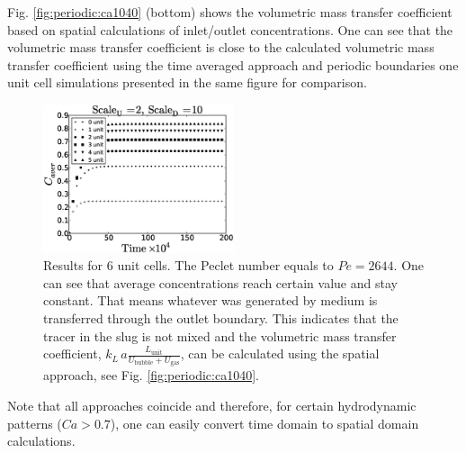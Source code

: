 \documentclass{article}
\newcommand{\vol}{k_L\,a}
\newcommand{\lunit}{L_{\mathrm{unit}}}
\newcommand{\ububble}{U_{\mathrm{bubble}}}
\newcommand{\ugas}{U_{\mathrm{gas}}}
\newcommand{\volnondim}{\vol \frac{\lunit}{\ububble+\ugas}}
\begin{document}
Fig. \ref{fig:periodic:ca1040}
(bottom) shows the volumetric mass transfer coefficient based on spatial calculations of
inlet/outlet concentrations. One can see that the volumetric mass transfer coefficient is close to
the calculated volumetric mass transfer coefficient using the time averaged approach and periodic
boundaries one unit cell simulations presented in the same figure for comparison.
\begin{figure}[htb!]
\begin{center}
\includegraphics[width=0.5\textwidth]{Figures/aver_units6scaleu2scaled5.eps}
\end{center}
\caption{Results for $6$ unit cells. The Peclet number equals to $Pe=2644$.
One can see that average concentrations reach certain value and stay constant.
That means whatever was
generated by medium is transferred through the outlet
boundary. This indicates that the tracer in the slug is not
mixed and the volumetric mass transfer coefficient, $\volnondim$, can be
calculated using the spatial approach, see Fig.
\ref{fig:periodic:ca1040}.\label{fig:6:units:ca1040}}
\end{figure}
Note
that all approaches coincide and therefore, for certain hydrodynamic patterns ($Ca>0.7$), one can
easily convert time domain to spatial domain calculations.
\end{document}

